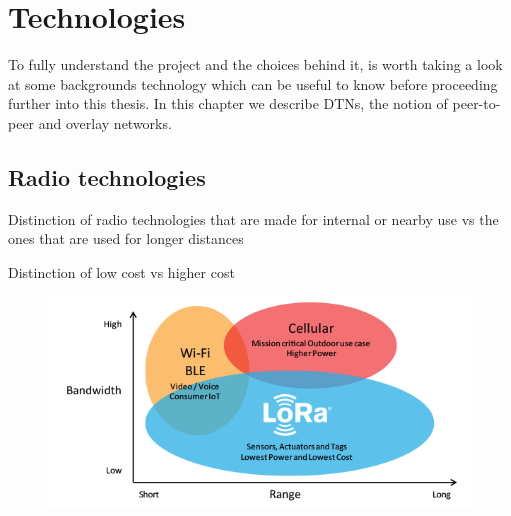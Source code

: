 
\chapter{Technologies}\label{chapter:technologies}

	To fully understand the project and the choices behind it, is worth taking a look at some backgrounds technology which can be useful to know before proceeding further into this thesis.
	In this chapter we describe DTNs, the notion of peer-to-peer and overlay networks.

	

	\section{Radio technologies}\label{sec:section_two}
	
		Distinction of radio technologies that are made for internal or nearby use vs the ones that are used for longer distances
		
		Distinction of low cost vs higher cost
		
	
		\begin{figure}
			\centering
			\includegraphics[width=\textwidth]{resources/img/LoRa_Why_Range}
			\caption{}
		\end{figure}
		
